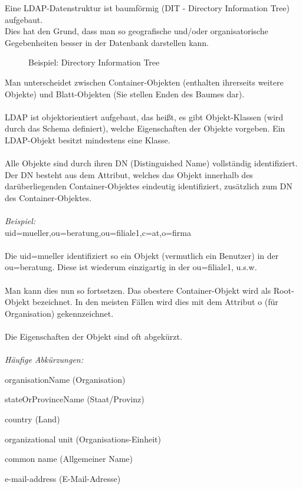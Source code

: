 Eine LDAP-Datenstruktur ist baumförmig (DIT - Directory Information Tree) aufgebaut.\\
Dies hat den Grund, dass man so geografische und/oder organisatorische Gegebenheiten besser in der Datenbank darstellen kann.
\\
\begin{figure}[H]
\centering
{}
\caption{Beispiel: Directory Information Tree}
\label{fig:content_ldap_dit}
\end{figure}
Man unterscheidet zwischen Container-Objekten (enthalten ihrerseits weitere Objekte) und Blatt-Objekten (Sie stellen Enden des Baumes dar).\\
\\
LDAP ist objektorientiert aufgebaut, das heißt, es gibt Objekt-Klassen (wird durch das Schema definiert), welche Eigenschaften der Objekte vorgeben. Ein LDAP-Objekt besitzt mindestens eine Klasse.\\
\\
Alle Objekte sind durch ihren DN (Distinguished Name) vollständig identifiziert. 
Der DN besteht aus dem Attribut, welches das Objekt innerhalb des darüberliegenden Container-Objektes eindeutig identifiziert, zusätzlich zum DN des Container-Objektes.\\
\\
\textit{Beispiel: }\\
uid=mueller,ou=beratung,ou=filiale1,c=at,o=firma\\
\\
Die uid=mueller identifiziert so ein Objekt (vermutlich ein Benutzer) in der ou=beratung. Diese ist wiederum einzigartig in der ou=filiale1, u.s.w.\\
\\
Man kann dies nun so fortsetzen. Das obestere Container-Objekt wird als Root-Objekt bezeichnet. In den meisten Fällen wird dies mit dem Attribut o (für Organisation) gekennzeichnet.\\
\\
Die Eigenschaften der Objekt sind oft abgekürzt.\\
\\
\textit{Häufige Abkürzungen:}\\
\begin{description}[style=nextline]
	\item[o]
		organisationName (Organisation)
	\item[st]
		stateOrProvinceName (Staat/Provinz)
	\item[c]
		country (Land)
	\item[ou]
		organizational unit (Organisations-Einheit)
	\item[cn]
		common name (Allgemeiner Name)
	\item[mail]
		e-mail-address (E-Mail-Adresse)
\end{description}

